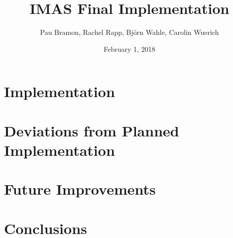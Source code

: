 \documentclass[11pt]{article}
\title{IMAS Final Implementation}
\begin{document}
\date{February 1, 2018}
\author{Pau Bramon, Rachel Rapp, Bj\"{o}rn Wahle, Carolin Wuerich}

\maketitle

\begin{abstract}	
	


\end{abstract}

\section{Implementation}\label{sec_implementation}



\section{Deviations from Planned Implementation}\label{sec_differences}



\section{Future Improvements}\label{sec_improvements}



\section{Conclusions}\label{sec_conclusions}


\end{document}
